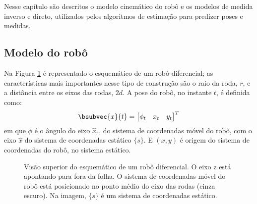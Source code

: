 Nesse capítulo  são descritos o modelo 
cinemático do robô e os modelos de medida inverso e direto, utilizados pelos algoritmos de estimação para predizer poses e medidas.

\subsection{Modelo do robô}
Na Figura \ref{fig:diff-drive-schematic} é representado o esquemático de um robô diferencial; as características mais importantes nesse tipo de construção 
são o raio da roda, $r$, e a distância entre os eixos das rodas, $2d$. A 
pose do robô, no instante $t$, é definida como:
\begin{equation}
  \bsubvec{x}{t} = \begin{bmatrix}
    \phi_t & x_t & y_t
  \end{bmatrix}^T
  \label{eq:robot-pose}
\end{equation}
em que $\phi$ é o ângulo do eixo $\hat{x}_r$, do sistema de coordenadas móvel 
do robô, com o eixo $\hat{x}$ do sistema de coordenadas estático $\{s\}$. E $(x, y)$ é origem do sistema de coordenadas do robô, no sistema estático.
\begin{figure}[h]
  \centering
  
  \caption[Esquemático de um robô diferencial]{Visão superior do esquemático de um robô diferencial. O eixo z está apontando para fora 
  da folha. O sistema de coordenadas móvel do robô está posicionado no ponto médio do eixo das rodas  (cinza escuro). Na imagem, $\{s\}$ é um sistema de coordenadas estático.}
  \label{fig:diff-drive-schematic}
\end{figure}

